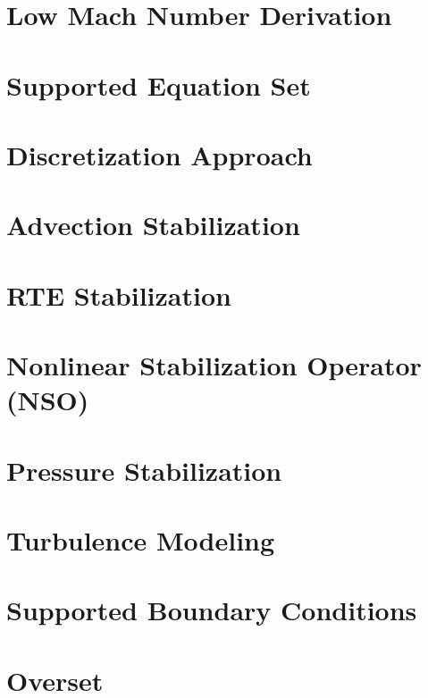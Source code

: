 \documentclass[12pt]{report}
\begin{document}
\section{Low Mach Number Derivation}


\section{Supported Equation Set}


\section{Discretization Approach}


\section{Advection Stabilization}


\section{RTE Stabilization}


\section{Nonlinear Stabilization Operator (NSO)}


\section{Pressure Stabilization}


\section{Turbulence Modeling}


\section{Supported Boundary Conditions}


\section{Overset}

\end{document}
